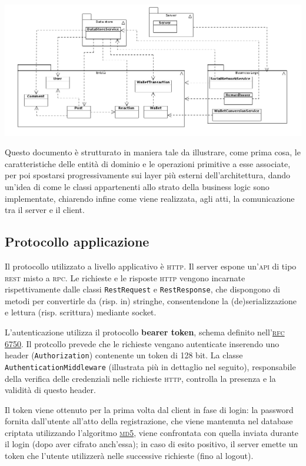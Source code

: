 \documentclass[a4paper,8pt]{article} %
\def\code#1{\texttt{#1}}
\begin{document}
\includegraphics[width=\textwidth]{dependencies.png}

\par Questo documento è strutturato in maniera tale da illustrare, come prima cosa, le caratteristiche delle entità
di dominio e le operazioni primitive a esse associate, per poi spostarsi progressivamente sui layer
più esterni dell'architettura, dando un'idea di come le classi appartenenti allo strato della business logic sono
implementate, chiarendo infine come viene realizzata, agli atti, la comunicazione tra il server e il client.\\
\subsection{Protocollo applicazione}
Il protocollo utilizzato a livello applicativo è \textsc{http}. Il server espone un'\textsc{api} di tipo \textsc{rest} misto a \textsc{rpc}. Le richieste e le risposte \textsc{http} vengono
incarnate rispettivamente dalle classi \code{RestRequest} e \code{RestResponse}, che dispongono di metodi per convertirle da (risp. in) stringhe, consentendone
la (de)serializzazione e lettura (risp. scrittura) mediante socket.
\par L'autenticazione utilizza il protocollo \textbf{bearer token}, schema definito nell'\href{https://datatracker.ietf.org/doc/html/rfc6750}{\textsc{rfc} 6750}.
Il protcollo prevede che le richieste vengano autenticate inserendo uno header (\code{Authorization}) contenente un token di 128 bit.
La classe \code{AuthenticationMiddleware} (illustrata più in dettaglio nel seguito), responsabile della verifica delle credenziali nelle richieste \textsc{http},
controlla la presenza e la validità di questo header.
\par Il token viene ottenuto per la prima volta dal client in fase di login: la password fornita dall'utente all'atto della registrazione, che viene mantenuta
nel database criptata utilizzando l'algoritmo \href{https://en.wikipedia.org/wiki/MD5}{\textsc{md5}}, viene confrontata con quella inviata durante il login (dopo aver
cifrato anch'essa); in caso di esito positivo, il server emette un token che l'utente utilizzerà nelle successive richieste (fino al logout).
\end{document}
